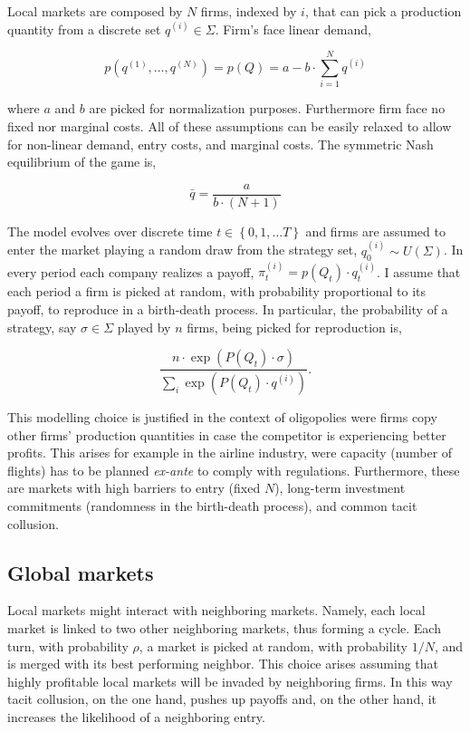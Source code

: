 \documentclass[american]{scrartcl}
\newcommand{\set}[1]{\left\{#1\right\}}
\begin{document}
Local markets are composed by $N$ firms, indexed by $i$, that can pick a production quantity from a discrete set $q^{(i)} \in \Sigma$. Firm's face linear demand,

\begin{equation}
    p(q^{(1)}, \ldots, q^{(N)}) = p(Q)= a - b \cdot \sum^{N}_{i=1} q^{(i)}
\end{equation}

where $a$ and $b$ are picked for normalization purposes. Furthermore firm face no fixed nor marginal costs. All of these assumptions can be easily relaxed to allow for non-linear demand, entry costs, and marginal costs. The symmetric Nash equilibrium of the game is,

\begin{equation}
    \bar{q}= \frac{a}{b \cdot (N+1)}
\end{equation}



The model evolves over discrete time $t \in \set{0, 1, \ldots T}$ and firms are assumed to enter the market playing a random draw from the strategy set,  $q^{(i)}_0 \sim U(\Sigma)$. In every period each company realizes a payoff, $\pi^{(i)}_t = p(Q_t) \cdot q^{(i)}_t$. I assume that each period a firm is picked at random, with probability proportional to its payoff, to reproduce in a birth-death process. In particular, the probability of a strategy, say $\sigma \in \Sigma$ played by $n$ firms, being picked for reproduction is,

\begin{equation}
    \frac{n \cdot \exp(P(Q_t) \cdot \sigma)}{\sum_{i} \exp(P(Q_t) \cdot q^{(i)})}.
\end{equation}



This modelling choice is justified in the context of oligopolies were firms copy other firms' production quantities in case the competitor is experiencing better profits. This arises for example in the airline industry, were capacity (number of flights) has to be planned \textit{ex-ante} to comply with regulations. Furthermore, these are markets with high barriers to entry (fixed $N$), long-term investment commitments (randomness in the birth-death process), and common tacit collusion.

\subsection{Global markets}

Local markets might interact with neighboring markets. Namely, each local market is linked to two other neighboring markets, thus forming a cycle. Each turn, with probability $\rho$, a market is picked at random, with probability $1 / N$, and is merged with its best performing neighbor. This choice arises assuming that highly profitable local markets will be invaded by neighboring firms. In this way tacit collusion, on the one hand, pushes up payoffs and, on the other hand, it increases the likelihood of a neighboring entry.
\end{document}
